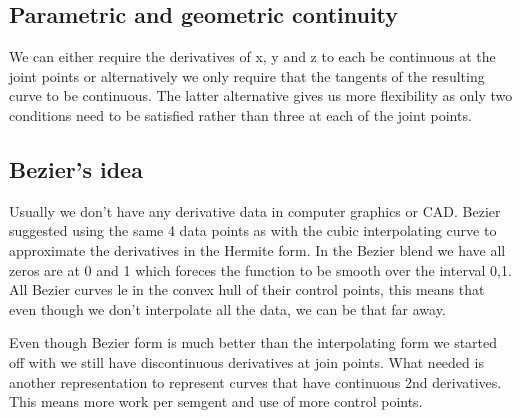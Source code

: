 	\subsection*{Parametric and geometric continuity}
	We can either require the derivatives of x, y and z to each be continuous at the joint points or alternatively we only require that the tangents of the resulting curve to be continuous. The latter alternative gives us more flexibility as only two conditions need to be satisfied rather than three at each of the joint points. 

	\subsection*{Bezier's idea}
	Usually we don't have any derivative data in computer graphics or CAD. Bezier suggested using the same 4 data points as with the cubic interpolating curve to approximate the derivatives in the Hermite form. In the Bezier blend we have all zeros are at 0 and 1 which foreces the function to be smooth over the interval 0,1. 
	All Bezier curves le in the convex hull of their control points, this means that even though we don't interpolate all the data, we can be that far away. 

	Even though Bezier form is much better than the interpolating form we started off with we still have discontinuous derivatives at join points. What needed is another representation to represent curves that have continuous 2nd derivatives. This means more work per semgent and use of more control points.
	
	



